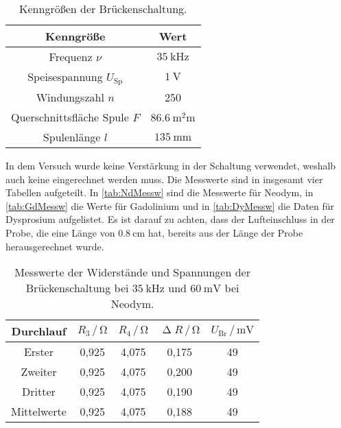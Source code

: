 \begin{table}[H]
  \centering
  \caption{Kenngrößen der Brückenschaltung.}
  \label{tab:kennGrBr}
  \begin{tabular}{c | c}
    \toprule
    Kenngröße & Wert \\
    \midrule
    Frequenz $\nu$ & $\SI{35}{\kilo\hertz}$ \\
    Speisespannung $U_{\text{Sp}}$ & $\SI{1}{\volt}$ \\
    Windungszahl $n$ & 250 \\
    Querschnittsfläche Spule $F$ & $\SI{86,6}{\square\milli\meter}$ \\
    Spulenlänge $l$ & $\SI{135}{\milli\meter}$ \\
    \bottomrule
  \end{tabular}
\end{table}

In dem Versuch wurde keine Verstärkung in der Schaltung verwendet, weshalb auch keine eingerechnet werden muss.
Die Messwerte sind in insgesamt vier Tabellen aufgeteilt. In \autoref{tab:NdMessw} sind die Messwerte für Neodym, in \autoref{tab:GdMessw} die Werte für Gadolinium und in \autoref{tab:DyMessw} die Daten für Dysprosium aufgelistet.
Es ist darauf zu achten, dass der Lufteinschluss in der Probe, die eine Länge von $\SI{0,8}{\centi\meter}$ hat, bereits aus der Länge der Probe herausgerechnet wurde.
\begin{table}[H]
  \centering
  \caption{Messwerte der Widerstände und Spannungen der Brückenschaltung bei $\SI{35}{\kilo\hertz}$ und $\SI{60}{\milli\volt}$ bei Neodym.}
  \label{tab:NdMessw}
  \begin{tabular}{c| c c c c}
    \toprule
    Durchlauf & $R_3 \,/\, \si{\ohm}$ & $R_4 \,/\, \si{\ohm}$ & $\upDelta R \,/\, \si{\ohm}$ & $U_{\text{Br}} \,/\, \si{\milli\volt}$ \\%
    \midrule
    Erster & 0,925 & 4,075 & 0,175 & 49 \\
    Zweiter & 0,925 & 4,075 & 0,200 & 49 \\
    Dritter & 0,925 & 4,075 & 0,190 & 49 \\
    Mittelwerte & 0,925 & 4,075 & 0,188 & 49\\
    \bottomrule
  \end{tabular}
\end{table}

